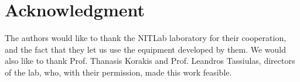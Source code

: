 \documentclass[conference]{IEEEtran}
\begin{document}







\section*{Acknowledgment}


The authors would like to thank the NITLab laboratory for their cooperation, and the fact that they let us use the equipment developed by them. 
We would also like to thank Prof. Thanasis Korakis and Prof. Leandros Tassiulas, directors of the lab, who, with their permission, made this work feasible.





%
%
\end{document}
